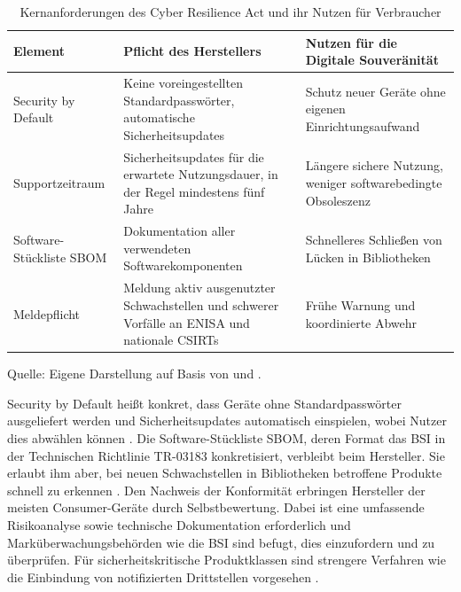 \begin{table}[htbp]
  \centering
  \caption{Kernanforderungen des Cyber Resilience Act und ihr Nutzen für Verbraucher}
  \label{tab:cra_anforderungen}
  \footnotesize
  \setlength{\tabcolsep}{4pt}
  \renewcommand{\arraystretch}{1.2}
  \begin{tabularx}{\textwidth}{@{}>{\raggedright\arraybackslash}p{2.8cm}
      >{\raggedright\arraybackslash}X
      >{\raggedright\arraybackslash}X@{}}
    \hline
    \textbf{Element} & \textbf{Pflicht des Herstellers}
      & \textbf{Nutzen für die Digitale Souveränität} \\
    \hline
    Security by Default
      & Keine voreingestellten Standardpasswörter, automatische
        Sicherheitsupdates \cite{noauthor_regulation_2024}
      & Schutz neuer Geräte ohne eigenen Einrichtungsaufwand \\
    Supportzeitraum
      & Sicherheitsupdates für die erwartete Nutzungsdauer, in der Regel
        mindestens fünf Jahre \cite{noauthor_regulation_2024}
      & Längere sichere Nutzung, weniger softwarebedingte Obsoleszenz \\
    Software-Stückliste \gls{SBOM}
      & Dokumentation aller verwendeten Softwarekomponenten \cite{noauthor_bsi_nodate}
      & Schnelleres Schließen von Lücken in Bibliotheken \\
    Meldepflicht
      & Meldung aktiv ausgenutzter Schwachstellen und schwerer Vorfälle an
        ENISA und nationale CSIRTs \cite{noauthor_regulation_2024}
      & Frühe Warnung und koordinierte Abwehr \\
    \hline
  \end{tabularx}
  \par\smallskip
  \raggedright\scriptsize
  Quelle: Eigene Darstellung auf Basis von \cite{noauthor_regulation_2024} und \cite{noauthor_cyber_nodate}.
\end{table}

Security by Default heißt konkret, dass Geräte ohne Standardpasswörter
ausgeliefert werden und Sicherheitsupdates automatisch einspielen, wobei
Nutzer dies abwählen können \cite{noauthor_regulation_2024}. Die Software-Stückliste \gls{SBOM},
deren Format das \gls{BSI} in der Technischen Richtlinie TR-03183 konkretisiert,
verbleibt beim Hersteller. Sie erlaubt ihm aber, bei neuen Schwachstellen in
Bibliotheken betroffene Produkte schnell zu erkennen \cite{noauthor_bsi_nodate}.
Den Nachweis der Konformität erbringen Hersteller der meisten
Consumer-Geräte durch Selbstbewertung. Dabei ist eine umfassende Risikoanalyse sowie technische Dokumentation erforderlich
und Marküberwachungsbehörden wie die \gls{BSI} sind befugt, dies einzufordern und zu überprüfen.
Für sicherheitskritische Produktklassen sind strengere Verfahren wie die Einbindung von notifizierten Drittstellen vorgesehen \cite{noauthor_regulation_2024}.

